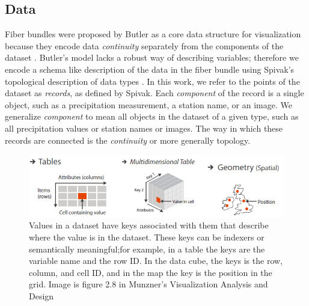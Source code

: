 \documentclass[../main.tex]{subfiles}
\begin{document}
\subsection{Data}
\label{sec:intro:data:continuity}
Fiber bundles were proposed by Butler as a core data structure for visualization because they encode data \textit{continuity} separately from the components of the dataset \cite{butlerVisualizationModelBased1989,butlerVectorBundleClassesForm1992}. Butler's model lacks a robust way of describing variables; therefore we encode a schema like description of the data in the fiber bundle using Spivak's topological description of data types \cite{spivakDatabasesAreCategories2010,spivakSIMPLICIALDATABASES}. In this work, we refer to the points of the dataset as \textit{records}, as defined by Spivak. Each \textit{component} of the record is a single object, such as a precipitation measurement, a station name, or an image. We generalize \textit{component} to mean all objects in the dataset of a given type, such as all precipitation values or station names or images. The way in which these records are connected is the \textit{continuity} or more generally topology.

\begin{figure}[H]
    \includegraphics[width=1\textwidth]{figures/intro/munzner_datatypes.png}
    \caption{Values in a dataset have keys associated with them that describe where the value is in the dataset. These keys can be indexers or semantically meaningful;for example, in a table the keys are the variable name and the row ID. In the data cube,  the keys is the row, column, and cell ID, and in the map the key is the position in the grid. Image is figure 2.8 in Munzner's Visualization Analysis and Design \cite{munznerVisualizationAnalysisDesign2014}}
    \label{fig:intro:keys:values}
\end{figure}
\end{document}
